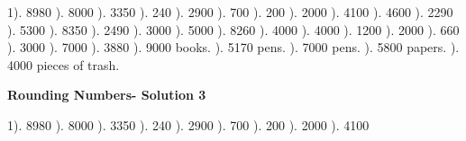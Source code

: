 \documentclass{article}%
\begin{document}
1). 8980%
). 8000%
). 3350%
). 240%
). 2900%
). 700%
). 200%
). 2000%
). 4100%
). 4600%
). 2290%
). 5300%
). 8350%
). 2490%
). 3000%
). 5000%
). 8260%
). 4000%
). 4000%
). 1200%
). 2000%
). 660%
). 3000%
). 7000%
). 3880%
). 9000 books.%
). 5170 pens.%
). 7000 pens.%
). 5800 papers.%
). 4000 pieces of trash.%
\newline%
\newpage%
\large%
\begin{center}%
\textbf{Rounding Numbers- Solution 3}%
\newline%
\end{center} \normalsize%
1). 8980%
). 8000%
). 3350%
). 240%
). 2900%
). 700%
). 200%
). 2000%
). 4100%
\newline%
\end{document}
